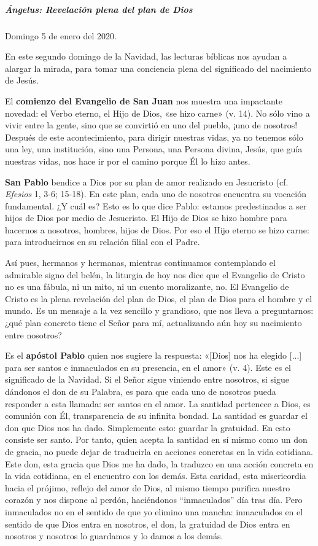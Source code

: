 \documentclass[]{article}
\let\oldsubparagraph\subparagraph
\renewcommand{\subparagraph}[1]{\oldsubparagraph{#1}\mbox{}}
\begin{document}
\subparagraph{Ángelus: Revelación plena del plan de
Dios}\label{uxe1ngelus-revelaciuxf3n-plena-del-plan-de-dios}

Domingo 5 de enero del 2020.

En este segundo domingo de la Navidad, las lecturas bíblicas nos ayudan
a alargar la mirada, para tomar una conciencia plena del significado del
nacimiento de Jesús.

El \textbf{comienzo del Evangelio de San Juan} nos muestra una
impactante novedad: el Verbo eterno, el Hijo de Dios, «se hizo carne»
(v. 14). No sólo vino a vivir entre la gente, sino que se convirtió en
uno del pueblo, ¡uno de nosotros! Después de este acontecimiento, para
dirigir nuestras vidas, ya no tenemos sólo una ley, una institución,
sino una Persona, una Persona divina, Jesús, que guía nuestras vidas,
nos hace ir por el camino porque Él lo hizo antes.

\textbf{San Pablo} bendice a Dios por su plan de amor realizado en
Jesucristo (cf. \emph{Efesios} 1, 3-6; 15-18). En este plan, cada uno de
nosotros encuentra su vocación fundamental. ¿Y cuál es? Esto es lo que
dice Pablo: estamos predestinados a ser hijos de Dios por medio de
Jesucristo. El Hijo de Dios se hizo hombre para hacernos a nosotros,
hombres, hijos de Dios. Por eso el Hijo eterno se hizo carne: para
introducirnos en su relación filial con el Padre.

Así pues, hermanos y hermanas, mientras continuamos contemplando el
admirable signo del belén, la liturgia de hoy nos dice que el Evangelio
de Cristo no es una fábula, ni un mito, ni un cuento moralizante, no. El
Evangelio de Cristo es la plena revelación del plan de Dios, el plan de
Dios para el hombre y el mundo. Es un mensaje a la vez sencillo y
grandioso, que nos lleva a preguntarnos: ¿qué plan concreto tiene el
Señor para mí, actualizando aún hoy su nacimiento entre nosotros?

Es el \textbf{apóstol Pablo} quien nos sugiere la respuesta: «{[}Dios{]}
nos ha elegido {[}...{]} para ser santos e inmaculados en su presencia,
en el amor» (v. 4). Este es el significado de la Navidad. Si el Señor
sigue viniendo entre nosotros, si sigue dándonos el don de su Palabra,
es para que cada uno de nosotros pueda responder a esta llamada: ser
santos en el amor. La santidad pertenece a Dios, es comunión con Él,
transparencia de su infinita bondad. La santidad es guardar el don que
Dios nos ha dado. Simplemente esto: guardar la gratuidad. En esto
consiste ser santo. Por tanto, quien acepta la santidad en sí mismo como
un don de gracia, no puede dejar de traducirla en acciones concretas en
la vida cotidiana. Este don, esta gracia que Dios me ha dado, la
traduzco en una acción concreta en la vida cotidiana, en el encuentro
con los demás. Esta caridad, esta misericordia hacia el prójimo, reflejo
del amor de Dios, al mismo tiempo purifica nuestro corazón y nos dispone
al perdón, haciéndonos ``inmaculados'' día tras día. Pero inmaculados no
en el sentido de que yo elimino una mancha: inmaculados en el sentido de
que Dios entra en nosotros, el don, la gratuidad de Dios entra en
nosotros y nosotros lo guardamos y lo damos a los demás.
\end{document}
